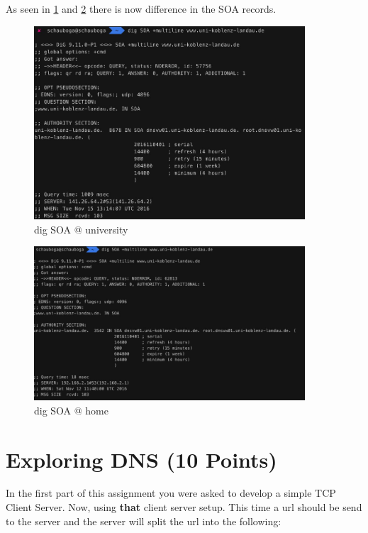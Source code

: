 \documentclass{WeSTassignment}
\begin{document}
As seen in \ref{fig:soa_uni} and \ref{fig:soa_home} there is now difference in the SOA records.

\begin{figure}[ht]
	\centering
	\includegraphics[width=0.9\textwidth]{tango_assignment3_1a.jpg}
	\caption{dig SOA @ university}
	\label{fig:soa_uni}
\end{figure}

\begin{figure}[ht]
	\centering
	\includegraphics[width=0.9\textwidth]{tango_assignment3_1b.jpg}
	\caption{dig SOA @ home}
	\label{fig:soa_home}
\end{figure}


\section{Exploring DNS (10 Points)}

In the first part of this assignment you were asked to develop a simple TCP Client Server. Now, using \textbf{that} client server setup.
This time a url should be send to the server and the server will split the url into the following:\\ 
\end{document}
